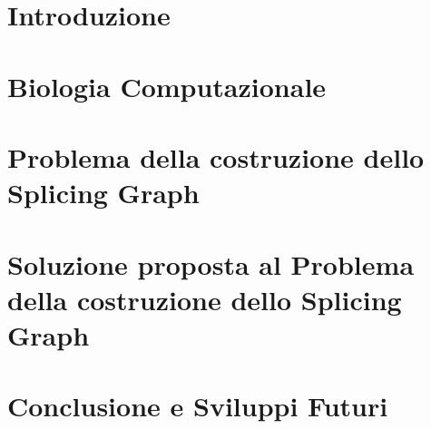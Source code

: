 \documentclass[12pt,a4paper]{report}
\begin{document}


\thispagestyle{empty}





\tableofcontents

\chapter{Introduzione}


\chapter{Biologia Computazionale}
\label{chap:comp_bio}


\chapter{Problema della costruzione dello Splicing Graph}


\chapter{Soluzione proposta al Problema della costruzione dello Splicing Graph}


\chapter{Conclusione e Sviluppi Futuri}


\printbibliography
\end{document}
